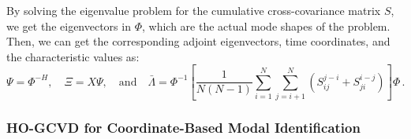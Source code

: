 \documentclass[10pt]{article}
\begin{document}
By solving the eigenvalue problem for the cumulative cross-covariance matrix $S$, we get the eigenvectors in $\Phi$, which are the actual mode shapes of the problem.
Then, we can get the corresponding adjoint eigenvectors, time coordinates, and the characteristic values as:
\begin{equation}
    \Psi = \Phi^{-H},\quad \Xi = X \Psi, \quad \mathrm{and} \quad \bar \Lambda = \Phi^{-1}\left[\frac{1}{N(N-1)}\sum_{i=1}^{N}\sum_{j=i+1}^{N} \left(S_{ij}^{j-i}+S_{ji}^{i-j}\right)\right] \Phi\,.
\end{equation}

\subsubsection{HO-GCVD for Coordinate-Based Modal Identification}
\end{document}
